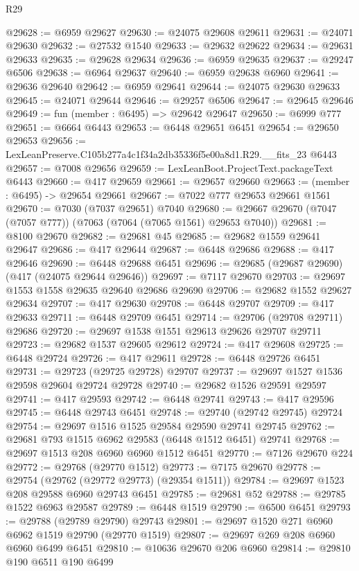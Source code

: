 \begin{lexlean}{R29}
\begin{coremodule}
@29628 := @6959 @29627
@29630 := @24075 @29608 @29611
@29631 := @24071 @29630
@29632 := @27532 @1540
@29633 := @29632 @29622
@29634 := @29631 @29633
@29635 := @29628 @29634
@29636 := @6959 @29635
@29637 := @29247 @6506
@29638 := @6964 @29637
@29640 := @6959 @29638 @6960
@29641 := @29636 @29640
@29642 := @6959 @29641
@29644 := @24075 @29630 @29633
@29645 := @24071 @29644
@29646 := @29257 @6506
@29647 := @29645 @29646
@29649 := fun (member : @6495) => @29642 @29647
@29650 := @6999 @777
@29651 := @6664 @6443
@29653 := @6448 @29651 @6451
@29654 := @29650 @29653
@29656 := LexLeanPreserve.C105b277a4c1f34a2db35336f5e00a8d1.R29.__fits_23 @6443
@29657 := @7008 @29656
@29659 := LexLeanBoot.ProjectText.packageText @6443
@29660 := @417 @29659
@29661 := @29657 @29660
@29663 := (member : @6495) -> @29654 @29661
@29667 := @7022 @777 @29653 @29661 @1561
@29670 := @7030 (@7037 @29651) @7040
@29680 := @29667 @29670 (@7047 (@7057 @777)) (@7063 (@7064 (@7065 @1561) @29653 @7040))
@29681 := @8100 @29670
@29682 := @29681 @45
@29685 := @29682 @1559 @29641 @29647
@29686 := @417 @29644
@29687 := @6448 @29686
@29688 := @417 @29646
@29690 := @6448 @29688 @6451
@29696 := @29685 (@29687 @29690) (@417 (@24075 @29644 @29646))
@29697 := @7117 @29670
@29703 := @29697 @1553 @1558 @29635 @29640 @29686 @29690
@29706 := @29682 @1552 @29627 @29634
@29707 := @417 @29630
@29708 := @6448 @29707
@29709 := @417 @29633
@29711 := @6448 @29709 @6451
@29714 := @29706 (@29708 @29711) @29686
@29720 := @29697 @1538 @1551 @29613 @29626 @29707 @29711
@29723 := @29682 @1537 @29605 @29612
@29724 := @417 @29608
@29725 := @6448 @29724
@29726 := @417 @29611
@29728 := @6448 @29726 @6451
@29731 := @29723 (@29725 @29728) @29707
@29737 := @29697 @1527 @1536 @29598 @29604 @29724 @29728
@29740 := @29682 @1526 @29591 @29597
@29741 := @417 @29593
@29742 := @6448 @29741
@29743 := @417 @29596
@29745 := @6448 @29743 @6451
@29748 := @29740 (@29742 @29745) @29724
@29754 := @29697 @1516 @1525 @29584 @29590 @29741 @29745
@29762 := @29681 @793 @1515 @6962 @29583 (@6448 @1512 @6451) @29741
@29768 := @29697 @1513 @208 @6960 @6960 @1512 @6451
@29770 := @7126 @29670 @224
@29772 := @29768 (@29770 @1512)
@29773 := @7175 @29670
@29778 := @29754 (@29762 (@29772 @29773) (@29354 @1511))
@29784 := @29697 @1523 @208 @29588 @6960 @29743 @6451
@29785 := @29681 @52
@29788 := @29785 @1522 @6963 @29587
@29789 := @6448 @1519
@29790 := @6500 @6451
@29793 := @29788 (@29789 @29790) @29743
@29801 := @29697 @1520 @271 @6960 @6962 @1519 @29790 (@29770 @1519)
@29807 := @29697 @269 @208 @6960 @6960 @6499 @6451
@29810 := @10636 @29670 @206 @6960
@29814 := @29810 @190 @6511 @190 @6499

\end{coremodule}
\end{lexlean}
